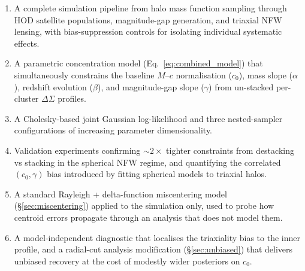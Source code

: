 \documentclass[12pt,a4paper]{article}
\begin{document}
\begin{enumerate}
  \item A complete simulation pipeline from halo mass function sampling through HOD
    satellite populations, magnitude-gap generation, and triaxial NFW lensing,
    with bias-suppression controls for isolating individual systematic effects.
  \item A parametric concentration model (Eq.~\ref{eq:combined_model}) that
    simultaneously constrains the baseline $M$--$c$ normalisation ($c_0$), mass
    slope ($\alpha$), redshift evolution ($\beta$), and magnitude-gap slope
    ($\gamma$) from un-stacked per-cluster $\Delta\Sigma$ profiles.
  \item A Cholesky-based joint Gaussian log-likelihood and three nested-sampler
    configurations of increasing parameter dimensionality.
  \item Validation experiments confirming $\sim\!2\times$ tighter constraints from
    destacking vs stacking in the spherical NFW regime, and quantifying the
    correlated $(c_0, \gamma)$ bias introduced by fitting spherical models to
    triaxial halos.
  \item A standard Rayleigh + delta-function miscentering model
    (§\ref{sec:miscentering}) applied to the simulation only, used to probe how
    centroid errors propagate through an analysis that does not model them.
  \item A model-independent diagnostic that localises the triaxiality bias to
    the inner profile, and a radial-cut analysis modification
    (§\ref{sec:unbiased}) that delivers unbiased recovery at the cost of
    modestly wider posteriors on $c_0$.
\end{enumerate}
\end{document}
